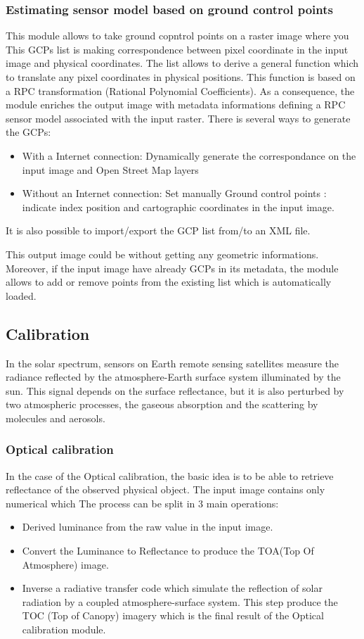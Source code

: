 \subsubsection{Estimating sensor model based on ground control points}
This module allows to take ground copntrol points on a raster image where you 
This GCPs list is making correspondence between pixel coordinate in the input image and physical coordinates. The list
allows to derive a general function which to translate any pixel coordinates in physical positions. This function is 
based on a RPC transformation (Rational Polynomial Coefficients). As a consequence, the module enriches the output image 
with metadata informations defining a RPC sensor model associated with the input raster. 
There is several ways to generate the GCPs:

\begin{itemize}
\item With a Internet connection: Dynamically generate the correspondance on the input image and Open Street Map layers
\item Without an  Internet connection: Set manually Ground control points : indicate index position and cartographic 
coordinates in the input image.  
\end{itemize}

It is also possible to import/export the GCP list from/to an XML file.

This output image could be without getting any geometric informations. Moreover, if the input image have already GCPs
in its metadata, the module allows to add or remove points from the existing list which is automatically loaded.       

\subsection{Calibration}
In the solar spectrum, sensors on Earth remote sensing satellites measure
the radiance reflected by the atmosphere-Earth surface system illuminated by the sun. This signal
depends on the surface reflectance, but it is also perturbed by two atmospheric processes, the
gaseous absorption and the scattering by molecules and aerosols.

   
\subsubsection{Optical calibration}
In the case of the Optical calibration, the basic idea is to be able to retrieve reflectance of the observed physical object.
The input image contains only numerical which 
The process can be split in 3 main operations:
\begin{itemize}
\item Derived luminance from the raw value in the input image. 
\item Convert the Luminance to Reflectance to produce the TOA(Top Of Atmosphere) image.
\item Inverse a radiative transfer code which simulate the reflection of solar radiation by a coupled atmosphere-surface system. This step produce 
the TOC (Top of Canopy) imagery which is the final result of the Optical calibration module. 
\end{itemize}
    
